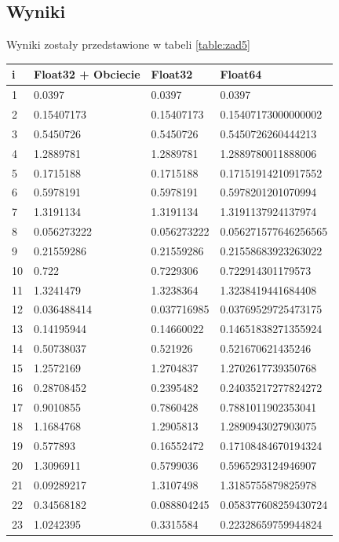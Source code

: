 \documentclass{article}
\begin{document}
        \subsection{Wyniki}
            Wyniki zostały przedstawione w tabeli \ref{table:zad5}
            {\small
            \begin{table}[h!]
            \begin{tabular}{l l l l}
                \hline
                 i & Float32 + Obciecie & Float32 & Float64 \\
                 \hline
        1 & 0.0397 & 0.0397 & 0.0397 \\
2 & 0.15407173 & 0.15407173 & 0.15407173000000002 \\
3 & 0.5450726 & 0.5450726 & 0.5450726260444213 \\
4 & 1.2889781 & 1.2889781 & 1.2889780011888006 \\
5 & 0.1715188 & 0.1715188 & 0.17151914210917552 \\
6 & 0.5978191 & 0.5978191 & 0.5978201201070994 \\
7 & 1.3191134 & 1.3191134 & 1.3191137924137974 \\
8 & 0.056273222 & 0.056273222 & 0.056271577646256565 \\
9 & 0.21559286 & 0.21559286 & 0.21558683923263022 \\
10 & 0.722 & 0.7229306 & 0.722914301179573 \\
11 & 1.3241479 & 1.3238364 & 1.3238419441684408 \\
12 & 0.036488414 & 0.037716985 & 0.03769529725473175 \\
13 & 0.14195944 & 0.14660022 & 0.14651838271355924 \\
14 & 0.50738037 & 0.521926 & 0.521670621435246 \\
15 & 1.2572169 & 1.2704837 & 1.2702617739350768 \\
16 & 0.28708452 & 0.2395482 & 0.24035217277824272 \\
17 & 0.9010855 & 0.7860428 & 0.7881011902353041 \\
18 & 1.1684768 & 1.2905813 & 1.2890943027903075 \\
19 & 0.577893 & 0.16552472 & 0.17108484670194324 \\
20 & 1.3096911 & 0.5799036 & 0.5965293124946907 \\
21 & 0.09289217 & 1.3107498 & 1.3185755879825978 \\
22 & 0.34568182 & 0.088804245 & 0.058377608259430724 \\
23 & 1.0242395 & 0.3315584 & 0.22328659759944824 \\

\end{tabular}
\end{table}}
\end{document}
